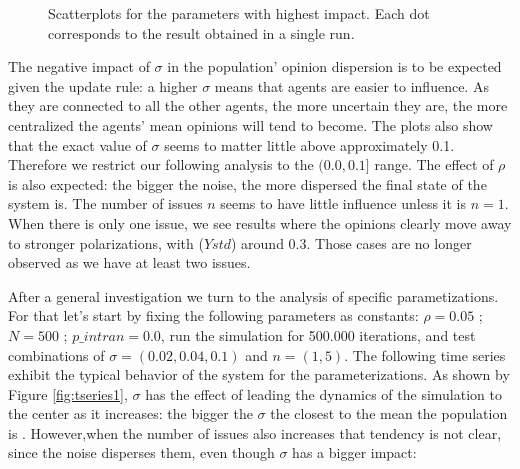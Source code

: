 \documentclass{article}
\begin{document}
\begin{figure}[H]
\begin{subfigure}[b]{0.5\textwidth}
     \end{subfigure}
     \caption{Scatterplots for the parameters with highest impact. Each dot corresponds to the result obtained in a single run.}
      \label{fig:scatters}
    \end{figure}



    The negative impact of \(\sigma\) in the population' opinion dispersion is
    to be expected given the update rule: a higher \(\sigma\) means that agents
    are easier to influence. As they are connected to all the other agents, the more
    uncertain they are, the more centralized the agents' mean opinions will tend to become. 
    The plots also show that the exact value of \(\sigma\) seems to matter little above approximately
    0.1. Therefore we restrict our following analysis to the \((0.0, 0.1 ] \)
    range. The effect of \(\rho\) is also expected: the bigger the noise, the more
    dispersed the final state of the system is. The number of issues $n$ seems to have little
    influence unless it is $n=1$. When there is only one issue, we see results where the opinions
    clearly move away to stronger polarizations, with (\(Ystd\)) around 0.3. Those cases are no
    longer observed as we have at least two issues.

    
    After a general investigation we turn to the analysis of specific
    parametizations. For that let's start by fixing the following parameters as
    constants: \(\rho = 0.05 \) ; \(N = 500\) ; \(p\_intran = 0.0\), run the
    simulation for 500.000 iterations, and test combinations of $\sigma = (0.02,
    0.04, 0.1)$ and $ n = (1,5)$. The following time series exhibit the typical
    behavior of the system for the parameterizations. As shown by Figure
    \ref{fig:tseries1}, \(\sigma\) has the effect of leading the dynamics of the
    simulation to the center as it increases: the bigger the \(\sigma\) the
    closest to the mean the population is . However,when the number of issues
    also increases that tendency is not clear, since the noise disperses them,
    even though \(\sigma\) has a bigger impact:
\end{document}
